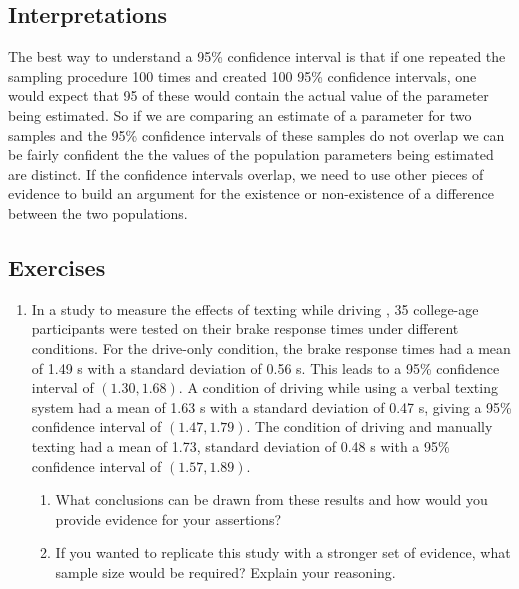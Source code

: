 \documentclass[
]{book}
\providecommand{\tightlist}{%
  \setlength{\itemsep}{0pt}\setlength{\parskip}{0pt}}
\theoremstyle{definition}
\theoremstyle{definition}
\theoremstyle{definition}
\theoremstyle{definition}
\theoremstyle{remark}
\begin{document}
\hypertarget{interpretations}{%
\subsection{Interpretations}\label{interpretations}}

The best way to understand a 95\% confidence interval is that if one repeated the sampling procedure 100 times and created 100 95\% confidence intervals, one would expect that 95 of these would contain the actual value of the parameter being estimated. So if we are comparing an estimate of a parameter for two samples and the 95\% confidence intervals of these samples do not overlap we can be fairly confident the the values of the population parameters being estimated are distinct. If the confidence intervals overlap, we need to use other pieces of evidence to build an argument for the existence or non-existence of a difference between the two populations.

\hypertarget{exercises-71}{%
\subsection{Exercises}\label{exercises-71}}

\begin{enumerate}
\def\labelenumi{\arabic{enumi}.}
\item
  In a study to measure the effects of texting while driving \citep{He2014}, 35 college-age participants were tested on their brake response times under different conditions. For the drive-only condition, the brake response times had a mean of 1.49 s with a standard deviation of 0.56 s. This leads to a 95\% confidence interval of \((1.30,1.68)\). A condition of driving while using a verbal texting system had a mean of 1.63 s with a standard deviation of 0.47 s, giving a 95\% confidence interval of \((1.47,1.79)\). The condition of driving and manually texting had a mean of 1.73, standard deviation of 0.48 s with a 95\% confidence interval of \((1.57, 1.89)\).

  \begin{enumerate}
  \def\labelenumii{\alph{enumii}.}
  \tightlist
  \item
    What conclusions can be drawn from these results and how would you provide evidence for your assertions?
  \item
    If you wanted to replicate this study with a stronger set of evidence, what sample size would be required? Explain your reasoning.
  \end{enumerate}
\end{enumerate}
\end{document}
